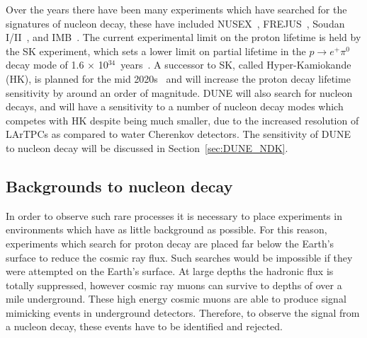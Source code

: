 Over the years there have been many experiments which have searched for the signatures of nucleon decay, these have included NUSEX~\citep{BATTISTONI1983454}, FREJUS~\citep{berger:in2p3-00015565}, Soudan I/II~\citep{SoudanLim}, and IMB~\citep{Gajewski:1989gh}. The current experimental limit on the proton lifetime is held by the SK experiment, which sets a lower limit on partial lifetime in the $p\ensuremath{\rightarrow}{e}^{+}{\ensuremath{\pi}}^{0}$ decay mode of 1.6 $\times$ 10$^{34}$~years~\citep{PhysRevD.95.012004}. A successor to SK, called Hyper-Kamiokande (HK), is planned for the mid 2020s~\citep{Abe:2011ts} and will increase the proton decay lifetime sensitivity by around an order of magnitude. DUNE will also search for nucleon decays, and will have a sensitivity to a number of nucleon decay modes which competes with HK despite being much smaller, due to the increased resolution of LArTPCs as compared to water Cherenkov detectors. The sensitivity of DUNE to nucleon decay will be discussed in Section~\ref{sec:DUNE_NDK}. \\  

\subsection{Backgrounds to nucleon decay} \label{sec:BkNDK}  %
In order to observe such rare processes it is necessary to place experiments in environments which have as little background as possible. For this reason, experiments which search for proton decay are placed far below the Earth's surface to reduce the cosmic ray flux. Such searches would be impossible if they were attempted on the Earth's surface. At large depths the hadronic flux is totally suppressed, however cosmic ray muons can survive to depths of over a mile underground. These high energy cosmic muons are able to produce signal mimicking events in underground detectors. Therefore, to observe the signal from a nucleon decay, these events have to be identified and rejected. \\

